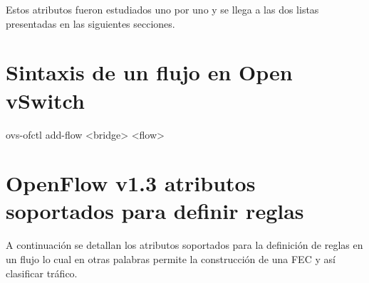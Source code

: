 Estos atributos fueron estudiados uno por uno y se llega a las dos listas presentadas en las siguientes secciones.\\

\section{Sintaxis de un flujo en Open vSwitch}

ovs-ofctl add-flow <bridge> <flow>

\section{OpenFlow v1.3 atributos soportados para definir reglas}

A continuaci\'on se detallan los atributos soportados para la definici\'on de reglas en un flujo lo cual en otras palabras permite la construcci\'on de una FEC y así clasificar tr\'afico.

